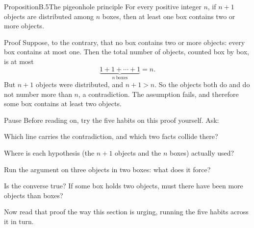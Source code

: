 \documentclass[a4paper,12pt,oneside]{memoir}
\begin{document}
\begin{envproposition}{Proposition}{B.5}{The pigeonhole principle}
For every positive integer \(n\), if \(n + 1\) objects are distributed among \(n\) boxes, then at least one box contains two or more objects.
\end{envproposition}
\begin{envproof}{Proof}{}{}
Suppose, to the contrary, that no box contains two or more objects: every box contains at most one. Then the total number of objects, counted box by box, is at most \[ \underbrace{1 + 1 + \cdots + 1}_{n\ \text{boxes}} = n. \] But \(n + 1\) objects were distributed, and \(n + 1 > n\). So the objects both do and do not number more than \(n\), a contradiction. The assumption fails, and therefore some box contains at least two objects. \qedmark
\end{envproof}
\begin{envremark}{Pause}{}{}
Before reading on, try the five habits on this proof yourself. Ask:

\begin{steps}
  \item Which line carries the contradiction, and which two facts collide there?
  \item Where is each hypothesis (the \(n + 1\) objects and the \(n\) boxes) actually used?
  \item Run the argument on three objects in two boxes: what does it force?
  \item Is the converse true? If some box holds two objects, must there have been more objects than boxes?
\end{steps}
\end{envremark}
\pagebreakbefore
Now read that proof the way this section is urging, running the five habits across it in turn.
\end{document}
